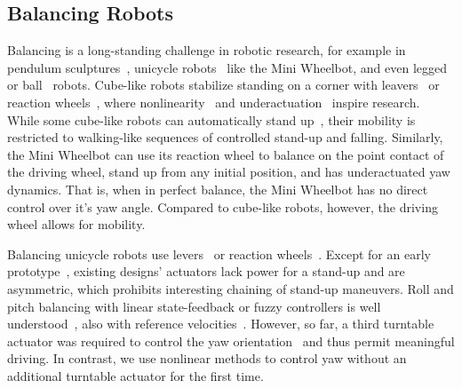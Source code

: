 \subsection{Balancing Robots}
Balancing is a long-standing challenge in robotic research, for example in pendulum sculptures~\cite{trimpe2012balancing,gajamohan2012cubli, mayr2015mechatronic,hofer2023one}, unicycle robots~\cite{geist2022wheelbot, schoonwinkel1988design, vos1990dynamics, xu2011pendulum, daud2017dynamic, lee2012decoupled, jae2011fuzzy, li2012attitude, rosyidi2016speed, neves2021discrete, rizal2015point, jin2010balancing} like the Mini Wheelbot, and even legged~\cite{klemm2019ascento} or ball~\cite{nagarajan2014ballbot} robots.
Cube-like robots stabilize standing on a corner with leavers~\cite{trimpe2012balancing} or reaction wheels~\cite{gajamohan2012cubli,mayr2015mechatronic,hofer2023one}, where nonlinearity~\cite{muehlebach2016nonlinear} and underactuation~\cite{hofer2023one} inspire research.
While some cube-like robots can automatically stand up~\cite{gajamohan2012cubli, mayr2015mechatronic, muehlebach2016nonlinear}, their mobility is restricted to walking-like sequences of controlled stand-up and falling.
Similarly, the Mini Wheelbot can use its reaction wheel to balance on the point contact of the driving wheel, stand up from any initial position, and has underactuated yaw dynamics.
That is, when in perfect balance, the Mini Wheelbot has no direct control over it's yaw angle.
Compared to cube-like robots, however, the driving wheel allows for mobility.

Balancing unicycle robots use levers~\cite{schoonwinkel1988design,jin2010balancing,xu2011pendulum,daud2017dynamic} or reaction wheels~\cite{geist2022wheelbot,neves2021discrete,jae2011fuzzy, rosyidi2016speed,lee2012decoupled,rizal2015point}.
Except for an early prototype~\cite{geist2022wheelbot}, existing designs' actuators lack power for a stand-up and are asymmetric, which prohibits interesting chaining of stand-up maneuvers.
Roll and pitch balancing with linear state-feedback or fuzzy controllers is well understood~\cite{xu2011pendulum, jae2011fuzzy, lee2012decoupled, neves2021discrete}, also with reference velocities~\cite{rosyidi2016speed}.
However, so far, a third turntable actuator was required to control the yaw orientation~\cite{schoonwinkel1988design,vos1990dynamics,rizal2015point,jin2010balancing} and thus permit meaningful driving.
In contrast, we use nonlinear methods to control yaw without an additional turntable actuator for the first time.
